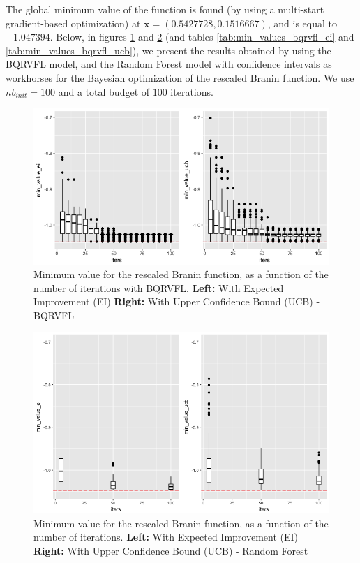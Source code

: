 \medskip

The global minimum value of the function is found (by using a multi-start gradient-based optimization) at $\textbf{x} = \left(0.5427728, 0.1516667\right)$, and is equal to $-1.047394$. Below, in figures \ref{min_value_dist_bqrvfl} and \ref{min_value_dist_rf} (and tables \ref{tab:min_values_bqrvfl_ei} and \ref{tab:min_values_bqrvfl_ucb}), we present the results obtained by using the BQRVFL model, and the Random Forest model with confidence intervals as workhorses for the Bayesian optimization of the rescaled Branin function. We use $nb_{init} = 100$ and a total budget of $100$ iterations. 

\medskip

\begin{figure}[!htb]
\centering
\includegraphics[width=13cm]{gfx/chapter-bayesianrvfl/evol_iter_ei_ucb.png}
\caption{Minimum value for the rescaled Branin function, as a function of the number of iterations with BQRVFL. 
\textbf{Left:} With Expected Improvement (EI) \textbf{Right:} With Upper Confidence Bound (UCB) - BQRVFL}
\label{min_value_dist_bqrvfl}
\end{figure}

\begin{figure}[!htb]
\centering
\includegraphics[width=13cm]{gfx/chapter-bayesianrvfl/evol_iter_ei_ucb_rf.png}
\caption{Minimum value for the rescaled Branin function, as a function of the number of iterations. 
\textbf{Left:} With Expected Improvement (EI) \textbf{Right:} With Upper Confidence Bound (UCB) - Random Forest}
\label{min_value_dist_rf}
\end{figure}

